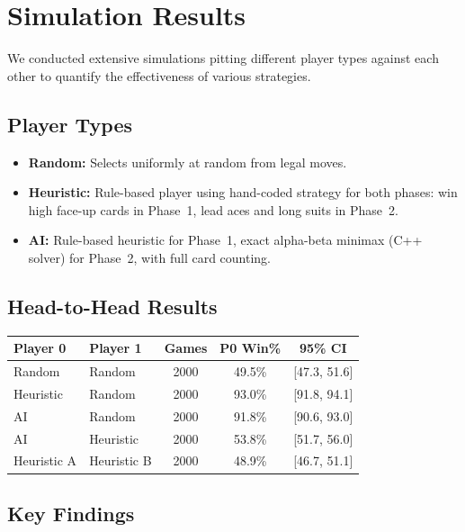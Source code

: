 \section{Simulation Results}
\label{sec:results}

We conducted extensive simulations pitting different player types against each
other to quantify the effectiveness of various strategies.

\subsection{Player Types}

\begin{itemize}
  \item \textbf{Random:} Selects uniformly at random from legal moves.
  \item \textbf{Heuristic:} Rule-based player using hand-coded strategy for
    both phases: win high face-up cards in Phase~1, lead aces and long suits
    in Phase~2.
  \item \textbf{AI:} Rule-based heuristic for Phase~1, exact alpha-beta
    minimax (C++ solver) for Phase~2, with full card counting.
\end{itemize}

\subsection{Head-to-Head Results}

\begin{center}
\begin{tabular}{llccc}
\toprule
Player 0 & Player 1 & Games & P0 Win\% & 95\% CI \\
\midrule
Random & Random & 2000 & 49.5\% & [47.3, 51.6] \\
Heuristic & Random & 2000 & 93.0\% & [91.8, 94.1] \\
AI & Random & 2000 & 91.8\% & [90.6, 93.0] \\
AI & Heuristic & 2000 & 53.8\% & [51.7, 56.0] \\
Heuristic A & Heuristic B & 2000 & 48.9\% & [46.7, 51.1] \\
\bottomrule
\end{tabular}
\end{center}


\subsection{Key Findings}

